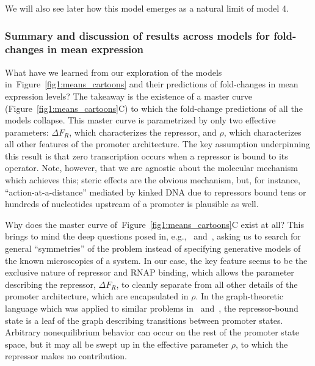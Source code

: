 \documentclass[12pt]{article}%
\newcommand{\fig}[1]{Figure~\ref{#1}}
\begin{document}
We will also see later how this model emerges as a natural limit of model 4.

\subsubsection{Summary and discussion of results across models for fold-changes in mean expression}
What have we learned from our exploration of the models
in~\fig{fig1:means_cartoons} and their predictions of
fold-changes in mean expression levels? The takeaway is the
existence of a master curve (\fig{fig1:means_cartoons}C) to which
the fold-change predictions of all the models collapse. This
master curve is parametrized by only two effective parameters:
$\Delta F_R$, which characterizes the repressor, and $\rho$,
which characterizes all other features of the promoter
architecture. The key assumption underpinning this result is that
zero transcription occurs when a repressor is bound to its
operator. Note, however, that we are agnostic about the molecular
mechanism which achieves this;
steric effects are the obvious mechanism, but, for instance,
``action-at-a-distance'' mediated by kinked DNA due to
repressors bound tens or hundreds of nucleotides upstream of a
promoter is plausible as well.

Why does the master curve of~\fig{fig1:means_cartoons}C exist at all?
This brings to mind the deep questions posed in,
e.g.,~\cite{Frank2013} and~\cite{Frank2014a}, asking us to search
for general ``symmetries'' of the problem instead of specifying
generative models of the known microscopics of a system.
In our case, the key feature seems to be the exclusive nature of
repressor and RNAP binding, which allows the parameter describing
the repressor, $\Delta F_R$, to cleanly separate from all other
details of the promoter architecture, which are encapsulated in $\rho$.
In the graph-theoretic language which was applied to similar
problems in~\cite{Gunawardena2012} and~\cite{Ahsendorf2014}, the
repressor-bound state is a leaf of the graph describing
transitions between promoter states. Arbitrary nonequilibrium
behavior can occur on the rest of the promoter state space, but
it may all be swept up in the effective parameter $\rho$, to
which the repressor makes no contribution.
\end{document}
